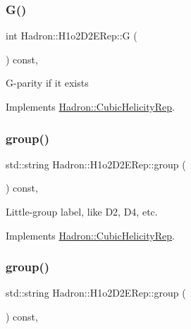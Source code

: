 \subsubsection{\texorpdfstring{G()}{G()}\hspace{0.1cm}{\footnotesize\ttfamily [3/3]}}
{\footnotesize\ttfamily int Hadron\+::\+H1o2\+D2\+E\+Rep\+::G (\begin{DoxyParamCaption}{ }\end{DoxyParamCaption}) const\hspace{0.3cm}{\ttfamily [inline]}, {\ttfamily [virtual]}}

G-\/parity if it exists 

Implements \mbox{\hyperlink{structHadron_1_1CubicHelicityRep_a50689f42be1e6170aa8cf6ad0597018b}{Hadron\+::\+Cubic\+Helicity\+Rep}}.

\mbox{\label{structHadron_1_1H1o2D2ERep_a932070dfad7ef632122da818917b4fcc}} 
\subsubsection{\texorpdfstring{group()}{group()}\hspace{0.1cm}{\footnotesize\ttfamily [1/5]}}
{\footnotesize\ttfamily std\+::string Hadron\+::\+H1o2\+D2\+E\+Rep\+::group (\begin{DoxyParamCaption}{ }\end{DoxyParamCaption}) const\hspace{0.3cm}{\ttfamily [inline]}, {\ttfamily [virtual]}}

Little-\/group label, like D2, D4, etc. 

Implements \mbox{\hyperlink{structHadron_1_1CubicHelicityRep_a101a7d76cd8ccdad0f272db44b766113}{Hadron\+::\+Cubic\+Helicity\+Rep}}.

\mbox{\label{structHadron_1_1H1o2D2ERep_a932070dfad7ef632122da818917b4fcc}} 
\subsubsection{\texorpdfstring{group()}{group()}\hspace{0.1cm}{\footnotesize\ttfamily [2/5]}}
{\footnotesize\ttfamily std\+::string Hadron\+::\+H1o2\+D2\+E\+Rep\+::group (\begin{DoxyParamCaption}{ }\end{DoxyParamCaption}) const\hspace{0.3cm}{\ttfamily [inline]}, {\ttfamily [virtual]}}


